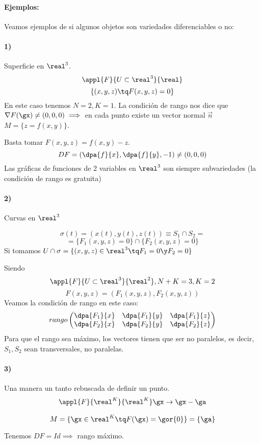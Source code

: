   \paragraph{Ejemplos:}
Veamos ejemplos de si algunos objetos son variedades diferenciables o no:
\paragraph{1)}
  Superficie en $\real^3$.
  \[\appl{F}{U\subset\real^3}{\real}\]
  \[\{(x,y,z) \tq F(x,y,z) = 0\}\]
  En este caso tenemos $N=2, K=1$.
  La condición de rango nos dice que $\nabla F(\gx) \neq (0,0,0) \implies $ en cada punto existe un vector normal $\overrightarrow{n}$
  \obs $M = \{z = f(x,y)\}$.
  
  Basta tomar $F(x,y,z) = f(x,y)-z$.
  \[DF = \left(\dpa{f}{x},\dpa{f}{y},-1\right) \neq (0,0,0)\]
  Las gráficas de funciones de 2 variables en $\real^3$ son siempre subvariedades (la condición de rango es gratuita)
  
\paragraph{2)}  Curvas en $\real^3$
  
  \[\sigma(t) = (x(t),y(t),z(t))\equiv S_1 \cap S_2 = \]
  \[= \{F_1(x,y,z) = 0\}\cap \{F_2(x,y,z) = 0\}\]
  Si tomamos $U\cap \sigma = \{(x,y,z)\in\real^3 \tq F_1 = 0 \y F_2 = 0\}$

  Siendo \[\appl{F}{U\subset\real^3}{\real^2}, N+K=3,K=2\]\[F(x,y,z) = (F_1(x,y,z),F_2(x,y,z))\]
  Veamos la condición de rango en este caso:
  \[rango \begin{pmatrix} \dpa{F_1}{x}&\dpa{F_1}{y}&\dpa{F_1}{z}\\\dpa{F_2}{x}&\dpa{F_2}{y}&\dpa{F_2}{z}\end{pmatrix}\]
  Para que el rango sea máximo, los vectores tienen que ser no paralelos, es decir, $S_1, S_2$ sean transversales, no paralelas.
  
  \paragraph{3)} Una manera un tanto rebuscada de definir un punto.
 \begin{gather*}
 \appl{F}{\real^K}{\real^K}
 \gx \rightarrow \gx - \ga
 \end{gather*}  
 
 \[M = \{\gx \in \real^K \tq F(\gx) = \gor{0}\} = \{\ga\}\]
 
 Tenemos $DF = Id \implies $ rango máximo.
 
